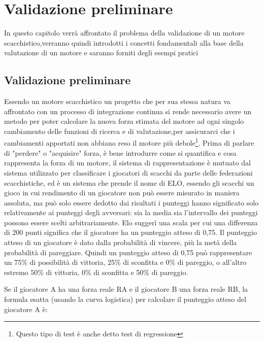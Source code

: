 \chapter{Validazione preliminare} %
%


\begin{citazione}
In questo capitolo verrà affrontato il problema della validazione di un motore scacchistico,verranno quindi introdotti i concetti fondamentali alla base della valutazione di un motore e saranno forniti 
degli esempi pratici
\end{citazione}

\newpage
\section*{Validazione preliminare}
Essendo un motore scacchistico un progetto che per sua stessa natura va affrontato con un processo di integrazione continua si rende necessario avere un metodo 
per poter calcolare la nuova forza stimata del motore  ad ogni singolo cambiamento  delle funzioni di ricerca e di valutazione,per assicurarci che i cambiamenti apportati non abbiano reso il motore più debole\footnote{Questo tipo di test è anche detto test di regressione}.
Prima di parlare di "perdere" o "acquisire" forza, è bene introdurre come si quantifica e cosa rappresenta la forza di un motore, il sistema di rappresentazione è mutuato dal sistema utilizzato per classificare i 
giocatori di scacchi da parte delle federazioni scacchistiche, ed è un sistema che prende il nome di ELO, essendo gli scacchi un gioco in cui  rendimento di un giocatore non può essere misurato in maniera assoluta,
ma può solo essere dedotto dai risultati i punteggi hanno significato solo relativamente ai punteggi degli avversari: 
sia la media sia l'intervallo dei punteggi possono essere scelti arbitrariamente. Elo suggerì una scala per cui una differenza di 200 punti significa che il giocatore ha un punteggio atteso di 0,75.
Il punteggio atteso di un giocatore è dato dalla probabilità di vincere, più la metà della probabilità di pareggiare. Quindi un punteggio atteso di 0,75 può rappresentare un 75\% di possibilità di vittoria, 
25\% di sconfitta e 0\% di pareggio, o all'altro estremo 50\% di vittoria, 0\% di sconfitta e 50\% di pareggio.

Se il giocatore A ha una forza reale RA e il giocatore B una forza reale RB, la formula esatta (usando la curva logistica) per calcolare il punteggio atteso del giocatore A è:

